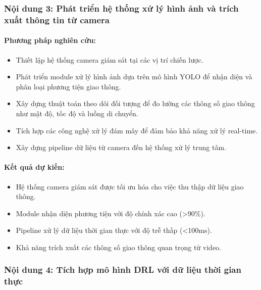 \documentclass[letterpaper]{article}
\begin{document}
\subsubsection{Nội dung 3: Phát triển hệ thống xử lý hình ảnh và trích xuất thông tin từ camera}

\paragraph{Phương pháp nghiên cứu:}
\begin{itemize}
    \item Thiết lập hệ thống camera giám sát tại các vị trí chiến lược.
    \item Phát triển module xử lý hình ảnh dựa trên mô hình YOLO để nhận diện và phân loại phương tiện giao thông.
    \item Xây dựng thuật toán theo dõi đối tượng để đo lường các thông số giao thông như mật độ, tốc độ và luồng di chuyển.
    \item Tích hợp các công nghệ xử lý đám mây để đảm bảo khả năng xử lý real-time.
    \item Xây dựng pipeline dữ liệu từ camera đến hệ thống xử lý trung tâm.
\end{itemize}

\paragraph{Kết quả dự kiến:}
\begin{itemize}
    \item Hệ thống camera giám sát được tối ưu hóa cho việc thu thập dữ liệu giao thông.
    \item Module nhận diện phương tiện với độ chính xác cao (>90\%).
    \item Pipeline xử lý dữ liệu thời gian thực với độ trễ thấp (<100ms).
    \item Khả năng trích xuất các thông số giao thông quan trọng từ video.
\end{itemize}

\subsubsection{Nội dung 4: Tích hợp mô hình DRL với dữ liệu thời gian thực}
\end{document}
